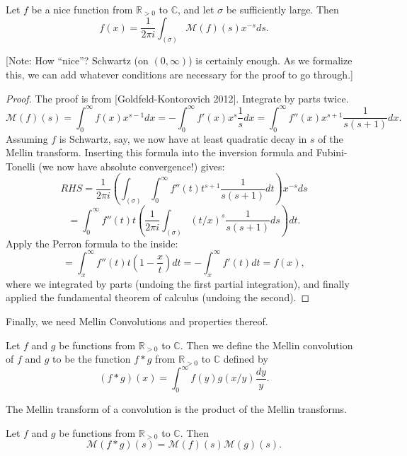 \begin{theorem}\label{MellinInversion}
Let $f$ be a nice function from $\mathbb{R}_{>0}$ to $\mathbb{C}$, and let $\sigma$ be sufficiently large. Then
$$f(x) = \frac{1}{2\pi i}\int_{(\sigma)}\mathcal{M}(f)(s)x^{-s}ds.$$
\end{theorem}

[Note: How ``nice''? Schwartz (on $(0,\infty)$) is certainly enough. As we formalize this, we can add whatever conditions are necessary for the proof to go through.]



\begin{proof}
The proof is from [Goldfeld-Kontorovich 2012].
Integrate by parts twice.
$$
\mathcal{M}(f)(s) = \int_0^\infty f(x)x^{s-1}dx = - \int_0^\infty f'(x)x^s\frac{1}{s}dx = \int_0^\infty f''(x)x^{s+1}\frac{1}{s(s+1)}dx.
$$
Assuming $f$ is Schwartz, say, we now have at least quadratic decay in $s$ of the Mellin transform. Inserting this formula into the inversion formula and Fubini-Tonelli (we now have absolute convergence!) gives:
$$
RHS = \frac{1}{2\pi i}\left(\int_{(\sigma)}\int_0^\infty f''(t)t^{s+1}\frac{1}{s(s+1)}dt\right) x^{-s}ds
$$
$$
= \int_0^\infty f''(t) t \left( \frac{1}{2\pi i}\int_{(\sigma)}(t/x)^s\frac{1}{s(s+1)}ds\right) dt.
$$
Apply the Perron formula to the inside:
$$
= \int_x^\infty f''(t) t \left(1-\frac{x}{t}\right)dt
= -\int_x^\infty f'(t) dt
= f(x),
$$
where we integrated by parts (undoing the first partial integration), and finally applied the fundamental theorem of calculus (undoing the second).
\end{proof}



Finally, we need Mellin Convolutions and properties thereof.
\begin{definition}\label{MellinConvolution}
Let $f$ and $g$ be functions from $\mathbb{R}_{>0}$ to $\mathbb{C}$. Then we define the Mellin convolution of $f$ and $g$ to be the function $f\ast g$ from $\mathbb{R}_{>0}$ to $\mathbb{C}$ defined by
$$(f\ast g)(x) = \int_0^\infty f(y)g(x/y)\frac{dy}{y}.$$
\end{definition}



The Mellin transform of a convolution is the product of the Mellin transforms.
\begin{theorem}\label{MellinConvolutionTransform}
Let $f$ and $g$ be functions from $\mathbb{R}_{>0}$ to $\mathbb{C}$. Then
$$\mathcal{M}(f\ast g)(s) = \mathcal{M}(f)(s)\mathcal{M}(g)(s).$$
\end{theorem}



